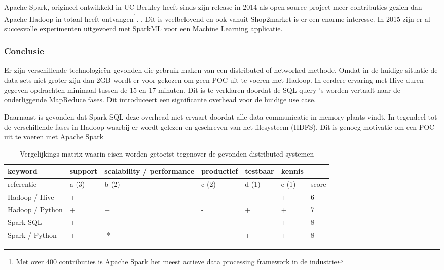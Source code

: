Apache Spark, origineel ontwikkeld in UC Berkley heeft sinds zijn release in 2014 als open source project meer contributies gezien dan Apache Hadoop in totaal heeft ontvangen\footnote{Met over 400 contributies is Apache Spark het meest actieve data processing framework in de industrie}. \parencite{armbrust2015spark}. Dit is veelbelovend en ook vanuit Shop2market is er een enorme interesse. In 2015 zijn er al succesvolle experimenten uitgevoerd met SparkML voor een Machine Learning applicatie.

\subsubsection{\textbf{Conclusie}}

Er zijn verschillende technologieën gevonden die gebruik maken van een distributed of networked methode. Omdat in de huidige situatie de data sets niet groter zijn dan 2GB wordt er voor gekozen om geen POC uit te voeren met Hadoop.  In eerdere ervaring met Hive duren gegeven opdrachten minimaal tussen de 15 en 17 minuten. Dit is te verklaren doordat de SQL query 's worden vertaalt naar de onderliggende MapReduce fases. \parencite{thusoo2010hive} Dit introduceert een significante overhead voor de huidige use case.

Daarnaast is gevonden dat Spark SQL deze overhead niet ervaart doordat alle data communicatie in-memory plaats vindt. In tegendeel tot de verschillende fases in Hadoop waarbij er wordt gelezen en geschreven van het filesysteem (HDFS). Dit is genoeg motivatie om een POC uit te voeren met Apache Spark

\begin{table}[bh]
\caption{Vergelijkings matrix waarin eisen worden getoetst tegenover de gevonden distributed systemen}
\label{tab:matrix_distributed}
\begin{tabular}{|l|l|l|l|l|l|l|}
\hline
keyword         & support & scalability / performance & productief & testbaar & kennis &       \\ \hline
referentie      & a (3)   & b (2)                     & c (2)      & d (1)    & e (1)  & score \\ \hline
Hadoop / Hive   & +       & +                         & -          & -        & +      & 6     \\ \hline
Hadoop / Python & +       & +                         & -          & +        & +      & 7     \\ \hline
Spark SQL       & +       & +                         & +          & -        & +      & 8     \\ \hline
Spark / Python  & +       & -*                        & +          & +        & +      & 8     \\ \hline
\end{tabular}
\end{table}